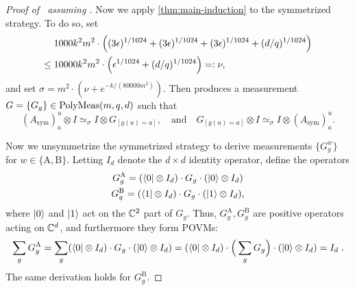 \begin{proof}[Proof of~ assuming ]
Now we apply \cref{thm:main-induction} to the symmetrized strategy.
To do so, set
\begin{align*}
&1000k^2 m^2 \cdot\Big((3\epsilon)^{1/1024} + (3\epsilon)^{1/1024} + (3\epsilon)^{1/1024} + (d/q)^{1/1024}\Big)\\
\leq{}& 10000 k^2 m^2 \cdot \Big(\epsilon^{1/1024} +  (d/q)^{1/1024}\Big)
=: \nu,
\end{align*}
and set $\sigma = m^2\cdot\left(\nu + e^{-k/(80000m^2)}\right)$.
Then  produces a measurement $G = \{G_g\} \in \mathrm{PolyMeas}(m, q, d)$ such that
\begin{equation}\label{eq:just-applied-induction}
(A_{\mathrm{sym}})^{u}_a \otimes I \simeq_{\sigma} I \otimes G_{[g(u)=a]}, \quad
\text{and}
\quad
G_{[g(u)=a]} \otimes I \simeq_{\sigma} I \otimes (A_{\mathrm{sym}})^u_a.
\end{equation}

Now we unsymmetrize the symmetrized strategy
to derive measurements $\{G^w_g\}$ for $w \in \{\mathrm{A},\mathrm{B}\}$.
Letting $I_d$ denote the $d \times d$ identity operator, define the operators
\begin{gather*}
    G^{\mathrm{A}}_g = (\bra{0} \otimes I_d) \cdot G_g\cdot (\ket{0} \otimes I_d) \\
    G^{\mathrm{B}}_g = (\bra{1} \otimes I_d) \cdot G_g\cdot (\ket{1} \otimes I_d),
\end{gather*}
where $\ket{0}$ and $\ket{1}$ act on the $\mathbb C^2$ part of $G_g$. Thus, $G^{\mathrm{A}}_g, G^{\mathrm{B}}_g$ are positive operators acting on $\mathbb C^d$, and furthermore they form POVMs:
\[
    \sum_g G^{\mathrm{A}}_g = \sum_g (\bra{0} \otimes I_d) \cdot G_g \cdot (\ket{0} \otimes I_d) = (\bra{0} \otimes I_d) \cdot \Big(\sum_g G_g\Big) \cdot (\ket{0} \otimes I_d) = I_d\;.
\]
The same derivation holds for $G^{\mathrm{B}}_g$. 


\end{proof}
